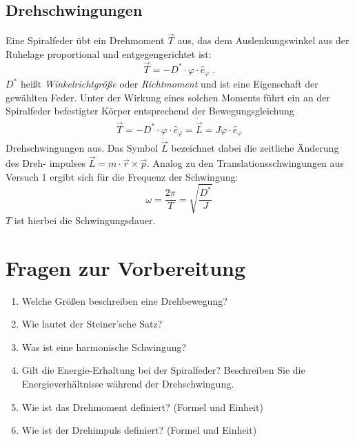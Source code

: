 \subsection{Drehschwingungen}

Eine Spiralfeder übt ein Drehmoment $\vec{T}$ aus, das dem Auslenkungswinkel aus der Ruhelage proportional und entgegengerichtet ist:
\begin{equation}
 \vec{T} = -D^*\cdot\varphi\cdot \hat{e}_{\varphi} \; .
\end{equation}
$D^*$ heißt \textit{Winkelrichtgröße} oder \textit{Richtmoment} und ist eine Eigenschaft der gewählten Feder. Unter der Wirkung eines solchen Moments führt ein an der Spiralfeder befestigter Körper entsprechend der Bewegungsgleichung
\begin{equation}
 \vec{T} = -D^*\cdot\varphi\cdot \hat{e}_{\varphi} = \dot{\vec{L}} = J\ddot{\varphi}\cdot\hat{e}_{\varphi}
\end{equation}
Drehschwingungen aus. Das Symbol $\dot{\vec{L}}$ bezeichnet dabei die zeitliche Änderung des Dreh- impulses $\vec{L} = m\cdot \vec{r}\times\vec{p}$. Analog zu den Translationsschwingungen aus Versuch 1 ergibt sich für die Frequenz der Schwingung:
\begin{equation}
 \omega = \frac{2\pi}{T} = \sqrt{\frac{D^*}{J}}
\end{equation}
$T$ ist hierbei die Schwingungsdauer.

\section{Fragen zur Vorbereitung}

\begin{enumerate} 
 \item Welche Größen beschreiben eine Drehbewegung?
 \item Wie lautet der Steiner'sche Satz?
 \item Was ist eine harmonische Schwingung?
 \item Gilt die Energie-Erhaltung bei der Spiralfeder? Beschreiben Sie die Energieverhältnisse während der Drehschwingung.
 \item Wie ist das Drehmoment definiert? (Formel und Einheit)
 \item Wie ist der Drehimpuls definiert? (Formel und Einheit)
\end{enumerate} 

